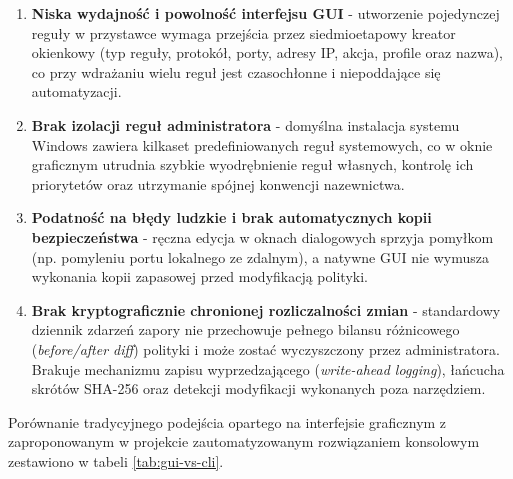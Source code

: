 \begin{enumerate}
    \item \textbf{Niska wydajność i powolność interfejsu GUI} - utworzenie pojedynczej reguły w przystawce  wymaga przejścia przez siedmioetapowy kreator okienkowy (typ reguły, protokół, porty, adresy IP, akcja, profile oraz nazwa), co przy wdrażaniu wielu reguł jest czasochłonne i niepoddające się automatyzacji.
    \item \textbf{Brak izolacji reguł administratora} - domyślna instalacja systemu Windows zawiera kilkaset predefiniowanych reguł systemowych, co w oknie graficznym utrudnia szybkie wyodrębnienie reguł własnych, kontrolę ich priorytetów oraz utrzymanie spójnej konwencji nazewnictwa.
    \item \textbf{Podatność na błędy ludzkie i brak automatycznych kopii bezpieczeństwa} - ręczna edycja w oknach dialogowych sprzyja pomyłkom (np. pomyleniu portu lokalnego ze zdalnym), a natywne GUI nie wymusza wykonania kopii zapasowej przed modyfikacją polityki.
    \item \textbf{Brak kryptograficznie chronionej rozliczalności zmian} - standardowy dziennik zdarzeń zapory nie przechowuje pełnego bilansu różnicowego (\textit{before/after diff}) polityki i może zostać wyczyszczony przez administratora. Brakuje mechanizmu zapisu wyprzedzającego (\textit{write-ahead logging}), łańcucha skrótów SHA-256 oraz detekcji modyfikacji wykonanych poza narzędziem.
\end{enumerate}

Porównanie tradycyjnego podejścia opartego na interfejsie graficznym z zaproponowanym w projekcie zautomatyzowanym rozwiązaniem konsolowym zestawiono w tabeli \ref{tab:gui-vs-cli}.

